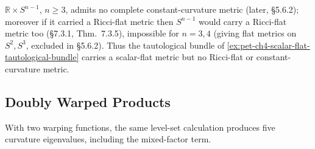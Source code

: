 \begin{remark}
  \label{rem:pet-ch4-scalar-flat-not-ricci-flat}

  $\mathbb{R}\times S^{n-1}$, $n\ge3$, admits no complete constant-curvature metric
  (later, §5.6.2); moreover if it carried a Ricci-flat metric then $S^{n-1}$
  would carry a Ricci-flat metric too (§7.3.1, Thm.\ 7.3.5), impossible for
  $n=3,4$ (giving flat metrics on $S^2,S^3$, excluded in §5.6.2). Thus the
  tautological bundle of \cref{ex:pet-ch4-scalar-flat-tautological-bundle}
  carries a scalar-flat metric but no Ricci-flat or constant-curvature metric.
\end{remark}

\subsection{Doubly Warped Products}

With two warping functions, the same level-set calculation produces five curvature
eigenvalues, including the mixed-factor term.

